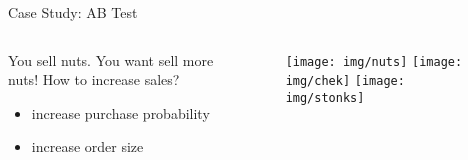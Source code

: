 \documentclass{beamer}
\begin{document}
\begin{frame}{Case Study: AB Test}
\begin{columns}
    \begin{column}{0.5\linewidth}
        You sell nuts. You want sell more nuts!
        How to increase sales?
        \begin{itemize}
            \item increase purchase probability
            \item increase order size
        \end{itemize}
    \end{column}
    \begin{column}{0.5\linewidth}
    \begin{figure}
        \centering
        \texttt{[image: img/nuts]}
        \texttt{[image: img/chek]}
        \texttt{[image: img/stonks]}
    \end{figure}
    \end{column}
\end{columns}
\end{frame}
\end{document}
